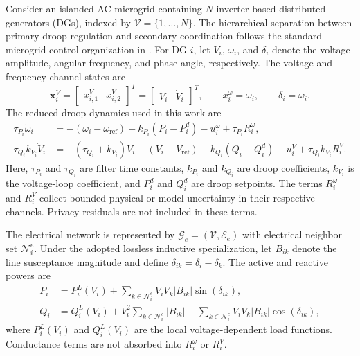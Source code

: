 \documentclass[journal]{IEEEtran}
\begin{document}
Consider an islanded AC microgrid containing $N$ inverter-based distributed generators (DGs), indexed by $\mathcal V=\{1,\ldots,N\}$. The hierarchical separation between primary droop regulation and secondary coordination follows the standard microgrid-control organization in \cite{Guerrero2011,Bidram2012}. For DG $i$, let $V_i$, $\omega_i$, and $\delta_i$ denote the voltage amplitude, angular frequency, and phase angle, respectively. The voltage and frequency channel states are
\begin{equation}
\bm{x}_i^V=
\begin{bmatrix}x_{i,1}^V & x_{i,2}^V\end{bmatrix}^{\!T}
=\begin{bmatrix}V_i & \dot V_i\end{bmatrix}^{\!T},
\qquad x_i^\omega=\omega_i,
\qquad \dot\delta_i=\omega_i.
\label{eq:physical_states}
\end{equation}
The reduced droop dynamics used in this work are
\begin{align}
\tau_{P_i}\dot\omega_i
&=-(\omega_i-\omega_{\mathrm{ref}})
-k_{P_i}(P_i-P_i^d)-u_i^\omega
+\tau_{P_i}R_i^\omega,
\label{eq:frequency_droop}\\
\tau_{Q_i}k_{V_i}\ddot V_i
&=-(\tau_{Q_i}+k_{V_i})\dot V_i
-(V_i-V_{\mathrm{ref}})
-k_{Q_i}(Q_i-Q_i^d)-u_i^V
+\tau_{Q_i}k_{V_i}R_i^V.
\label{eq:voltage_droop}
\end{align}
Here, $\tau_{P_i}$ and $\tau_{Q_i}$ are filter time constants, $k_{P_i}$ and $k_{Q_i}$ are droop coefficients, $k_{V_i}$ is the voltage-loop coefficient, and $P_i^d$ and $Q_i^d$ are droop setpoints. The terms $R_i^\omega$ and $R_i^V$ collect bounded physical or model uncertainty in their respective channels. Privacy residuals are not included in these terms.

The electrical network is represented by $\mathcal G_e=(\mathcal V,\mathcal E_e)$ with electrical neighbor set $\mathcal N_i^e$. Under the adopted lossless inductive specialization, let $B_{ik}$ denote the line susceptance magnitude and define $\delta_{ik}=\delta_i-\delta_k$. The active and reactive powers are
\begin{align}
P_i
&=P_i^L(V_i)+\sum_{k\in\mathcal N_i^e}
V_iV_k|B_{ik}|\sin(\delta_{ik}),
\label{eq:active_power_flow}\\
Q_i
&=Q_i^L(V_i)+V_i^2\sum_{k\in\mathcal N_i^e}|B_{ik}|
-\sum_{k\in\mathcal N_i^e}V_iV_k|B_{ik}|\cos(\delta_{ik}),
\label{eq:reactive_power_flow}
\end{align}
where $P_i^L(V_i)$ and $Q_i^L(V_i)$ are the local voltage-dependent load functions. Conductance terms are not absorbed into $R_i^\omega$ or $R_i^V$.
\end{document}
